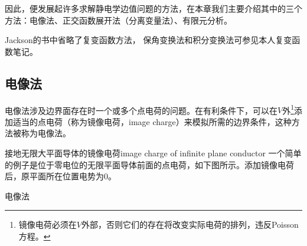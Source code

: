 因此，便发展起许多求解静电学边值问题的方法，在本章我们主要介绍其中的三个方法：电像法、正交函数展开法（分离变量法）、有限元分析。

Jackson的书中省略了复变函数方法，%
保角变换法和积分变换法可参见本人复变函数笔记。
\subsection{电像法}
电像法涉及边界面存在时一个或多个点电荷的问题。在有利条件下，可以在$V$外\footnote{镜像电荷必须在$V$外部，否则它们的存在将改变实际电荷的排列，违反Poisson方程。}添加适当的点电荷（称为镜像电荷，image charge）来模拟所需的边界条件，这种方法被称为电像法。
\begin{example}{接地无限大平面导体的镜像电荷}{image charge of infinite plane conductor}
    一个简单的例子是位于零电位的无限平面导体前面的点电荷，如下图所示。添加镜像电荷后，原平面所在位置电势为0。
    \begin{center}
        \usetikzlibrary{patterns}
        \qqquad
        \tikzchap 电像法
    \end{center}
\end{example}
